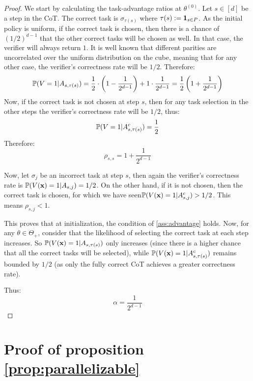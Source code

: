 \documentclass{article}
\theoremstyle{plain}
\theoremstyle{definition}
\theoremstyle{remark}
\begin{document}
\begin{proof}
We start by calculating the task-advantage ratios at $\theta^{(0)}$. Let $s\in [d]$ be a step in the CoT. The correct task is $\sigma_{\tau(s)}$ where $\tau(s) := \unit_{s \in P}$. As the initial policy is uniform, if the correct task is chosen, then there is a chance of $(1/2)^{d-1}$ that the other correct tasks will be chosen as well. In that case, the verifier will always return $1$. It is well known that different parities are uncorrelated over the uniform distribution on the cube, meaning that for any other case, the verifier's correctness rate will be $1/2$.
Therefore:
\begin{equation}
    \P (V=1|A_{s,\tau(s)}) = \frac{1}{2}\cdot\left(1-\frac{1}{2^{d-1}}\right) + 1\cdot \frac{1}{2^{d-1}} = \frac{1}{2}\left(1+\frac{1}{2^{d-1}}\right)
\end{equation}
Now, if the correct task is not chosen at step $s$, then for any task selection in the other steps the verifier's correctness rate will be $1/2$, thus:
\begin{equation}
    \P(V=1|A_{s,\tau(s)}^c)=\frac{1}{2}
\end{equation}
Therefore:
\begin{equation}
    \rho_{s,s} = 1+\frac{1}{2^{d-1}}
\end{equation}

Now, let $\sigma_j$ be an incorrect task at step $s$, then again the verifier's correctness rate is $\P(V(\x)=1|A_{s,j})=1/2$. On the other hand, if it is not chosen, then the correct task is chosen, for which we have seen$\P(V(\x)=1|A_{s,j}^c)>1/2$. This means $\rho_{s,j}<1$.

This proves that at initialization, the condition of \ref{ass:advantage} holds.
Now, for any $\theta\in \Theta_+$, consider that the likelihood of selecting the correct task at each step increases. So $\P(V(\x)=1|A_{s,\tau(s)})$ only increases (since there is a higher chance that all the correct tasks will be selected), while $\P(V(\x)=1|A_{s,\tau(s)}^c)$ remains bounded by $1/2$ (as only the fully correct CoT achieves a greater correctness rate).

Thus:
\begin{equation}
    \alpha = \frac{1}{2^{d-1}}
\end{equation}

\end{proof}

\section{Proof of proposition \ref{prop:parallelizable}}\label{proof:parallelizable}
\end{document}
